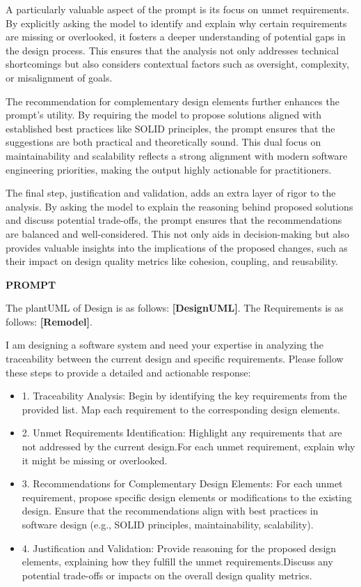 \documentclass[pdflatex,sn-mathphys-num]{sn-jnl}%
\theoremstyle{thmstyleone}%
\theoremstyle{thmstyletwo}%
\theoremstyle{thmstylethree}%
\begin{document}
\begin{itemize}
A particularly valuable aspect of the prompt is its focus on unmet requirements. By explicitly asking the model to identify and explain why certain requirements are missing or overlooked, it fosters a deeper understanding of potential gaps in the design process. This ensures that the analysis not only addresses technical shortcomings but also considers contextual factors such as oversight, complexity, or misalignment of goals.

The recommendation for complementary design elements further enhances the prompt's utility. By requiring the model to propose solutions aligned with established best practices like SOLID principles, the prompt ensures that the suggestions are both practical and theoretically sound. This dual focus on maintainability and scalability reflects a strong alignment with modern software engineering priorities, making the output highly actionable for practitioners.

The final step, justification and validation, adds an extra layer of rigor to the analysis. By asking the model to explain the reasoning behind proposed solutions and discuss potential trade-offs, the prompt ensures that the recommendations are balanced and well-considered. This not only aids in decision-making but also provides valuable insights into the implications of the proposed changes, such as their impact on design quality metrics like cohesion, coupling, and reusability.

\begin{tcolorbox}[title = {Traceability Between Design and Requirements}]
\textbf{PROMPT}

The plantUML of Design is as follows: \textbf{[DesignUML]}. The Requirements is as follows: \textbf{[Remodel]}. 

I am designing a software system and need your expertise in analyzing the traceability between the current design and specific requirements. Please follow these steps to provide a detailed and actionable response:

\begin{itemize}
    \item 1. Traceability Analysis: Begin by identifying the key requirements from the provided list. Map each requirement to the corresponding design elements.
    \item 2. Unmet Requirements Identification: Highlight any requirements that are not addressed by the current design.For each unmet requirement, explain why it might be missing or overlooked.
    \item 3. Recommendations for Complementary Design Elements: For each unmet requirement, propose specific design elements or modifications to the existing design. Ensure that the recommendations align with best practices in software design (e.g., SOLID principles, maintainability, scalability).
    \item 4. Justification and Validation: Provide reasoning for the proposed design elements, explaining how they fulfill the unmet requirements.Discuss any potential trade-offs or impacts on the overall design quality metrics.
\end{itemize}


\end{tcolorbox}
\end{itemize}
\end{document}

